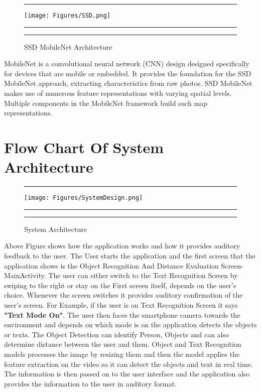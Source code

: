 \documentclass[MScCS]{uccthesis}
\begin{document}
\begin{figure}[H]
      \hrule
      \vspace{0.5em}
     \centering
      \texttt{[image: Figures/SSD.png]}
      \vspace{0.5em}
      \hrule
      \caption{\centering\label{fig:SSD}SSD MobileNet Architecture}
      \vspace{0.5em}
      \hrule
   \end{figure}

MobileNet is a convolutional neural network (CNN) design designed specifically for devices that are mobile or embedded. It provides the foundation for the SSD MobileNet approach, extracting characteristics from raw photos. SSD MobileNet makes use of numerous feature representations with varying spatial levels. Multiple components in the MobileNet framework build such map representations. 


\section{Flow Chart Of System Architecture}
\begin{figure}[H]
      \hrule
      \vspace{0.5em}
     \centering
      \texttt{[image: Figures/SystemDesign.png]}
      \vspace{0.5em}
      \hrule
      \caption{\centering\label{fig:SystemDesign}System Architecture}
      \vspace{0.5em}
      \hrule
   \end{figure}

Above Figure shows how the application works and how it provides auditory feedback to the user. The User starts the application and the first screen that the application shows is the Object Recognition And Distance Evaluation Screen-MainActivity. The user can either switch to the Text Recognition Screen by swiping to the right or stay on the First screen itself, depends on the user's choice. Whenever the screen switches it provides auditory confirmation of the user's screen. For Example, if the user is on Text Recognition Screen it says \textbf{"Text Mode On"}. The user then faces the smartphone camera towards the environment and depends on which mode is on the application detects the objects or texts.  The Object Detection can identify Person, Objects and can also determine distance between the user and them. Object and Text Recognition models processes the image by resizing them and then the model applies the feature extraction on the video so it can detect the objects and text in real time. The information is then passed on to the user interface and the application also provides the information to the user in auditory format.
\end{document}
